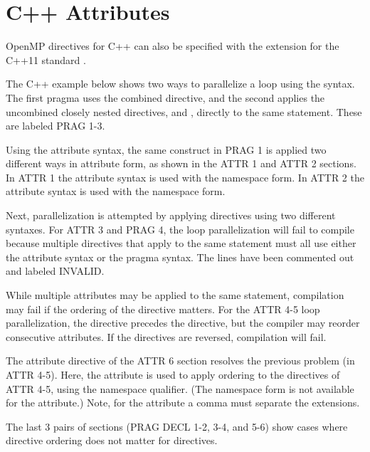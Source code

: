 \section{C++ Attributes}
\label{sec:attributes}

OpenMP directives for C++ can also be specified with 
the  extension for the C++11 standard .

The C++ example below shows two ways to parallelize a  loop using the  syntax.
The first pragma uses the combined  directive, and the second
applies the uncombined closely nested directives,  and , directly to the same statement. 
These are labeled PRAG 1-3.

Using the attribute syntax, the same construct in PRAG 1
is applied two different ways in attribute form, as shown in the ATTR 1 and ATTR 2 sections.
In ATTR 1 the attribute syntax is used with the  namespace form.
In ATTR 2 the attribute syntax is used with the  namespace form.

Next, parallelization is attempted by applying directives using two different syntaxes.
For ATTR 3 and PRAG 4, the loop parallelization will fail to compile because multiple directives that
apply to the same statement must all use either the attribute syntax or the pragma syntax.
The lines have been commented out and labeled INVALID.

While multiple attributes may be applied to the same statement,
compilation may fail if the ordering of the directive matters.
For the ATTR 4-5 loop parallelization, the  directive precedes 
the  directive, but the compiler may reorder consecutive attributes.
If the directives are reversed, compilation will fail.

The attribute directive of the ATTR 6 section resolves the previous problem (in ATTR 4-5).
Here, the  attribute is used to apply ordering to the
directives of ATTR 4-5, using the  namespace qualifier. (The
 namespace form is not available for the  attribute.) 
Note, for the  attribute a comma must separate the  extensions.


The last 3 pairs of sections (PRAG DECL 1-2, 3-4, and 5-6) show cases where 
directive ordering does not matter for  directives. 

